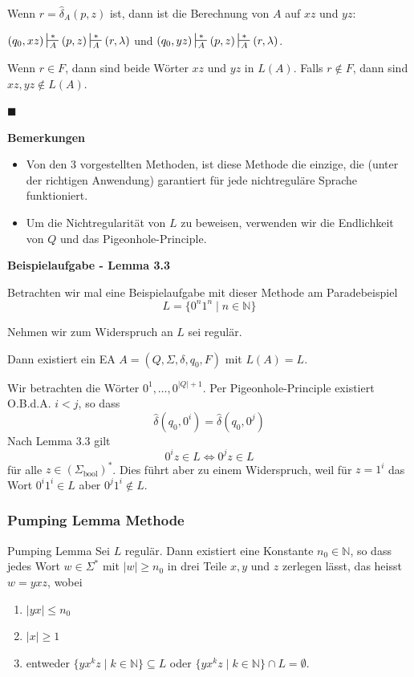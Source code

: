 \documentclass[a4paper, 11pt]{article}
\def\N{\mathbb{N}}
\newcommand\myTitle[1]{{\large \textbf {#1}}}
\begin{document}
    Wenn $r = \hat{\delta}_A(p, z)$ ist, dann ist die Berechnung von $A$ auf $xz$ und $yz$:

    $(q_0, xz) \sststile{A}{*} (p, z) \sststile{A}{*} (r, \lambda)$ und $(q_0, yz) \sststile{A}{*} (p, z) \sststile{A}{*} (r, \lambda)$.

    Wenn $r \in F$, dann sind beide Wörter $xz$ und $yz$ in $L(A)$. Falls $r \notin F$, dann sind $xz, yz \notin L(A)$.

    \hspace*{0pt}\hfill$\blacksquare$

    \myTitle{Bemerkungen}\\
    \begin{itemize}[label=-]
        \item Von den 3 vorgestellten Methoden, ist diese Methode die einzige, die (unter der richtigen Anwendung) garantiert für jede nichtreguläre Sprache funktioniert.
        \item Um die Nichtregularität von $L$ zu beweisen, verwenden wir die Endlichkeit von $Q$ und das Pigeonhole-Principle.
    \end{itemize}

    \myTitle{Beispielaufgabe - Lemma 3.3}

    Betrachten wir mal eine Beispielaufgabe mit dieser Methode am Paradebeispiel $$L = \{0^n1^n \mid n \in \N\}$$

    Nehmen wir zum Widerspruch an $L$ sei regulär.

    Dann existiert ein EA $A = (Q, \Sigma, \delta, q_0, F)$ mit $L(A) = L$.

    Wir betrachten die Wörter $0^1, \dots, 0^{|Q|+1}$. Per Pigeonhole-Principle existiert O.B.d.A. $i < j$, so dass 
    $$\hat{\delta}(q_0, 0^i) = \hat{\delta}(q_0, 0^{j})$$ 
    Nach Lemma 3.3 gilt
    $$0^iz \in L \iff 0^jz \in L$$
    für alle $z \in (\Sigma_{\text{bool}})^*$. Dies führt aber zu einem Widerspruch, weil für $z = 1^i$ das Wort $0^i1^i \in L$ aber $0^j1^i \notin L$.

    \subsubsection{Pumping Lemma Methode}
    \begin{mainbox}{Pumping Lemma}
        Sei $L$ regulär. Dann existiert eine Konstante $n_0 \in \N$, so dass jedes Wort $w \in \Sigma^*$ mit $|w| \geq n_0$ in drei Teile $x, y$ und $z$ zerlegen lässt, das heisst $w = yxz$, wobei
        \begin{enumerate}[label=(\roman*)]
            \item $|yx| \leq n_0$
            \item $|x| \geq 1$
            \item entweder $\{yx^kz \mid k \in \N\} \subseteq L$ oder $\{yx^kz \mid k \in \N\} \cap L = \emptyset$.
        \end{enumerate}
    \end{mainbox}
    
\end{document}
